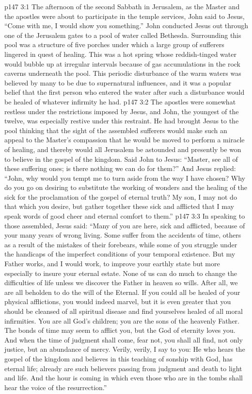 \vs p147 3:1 The afternoon of the second Sabbath in Jerusalem, as the Master and the apostles were about to participate in the temple services, John said to Jesus, “Come with me, I would show you something.” John conducted Jesus out through one of the Jerusalem gates to a pool of water called Bethesda. Surrounding this pool was a structure of five porches under which a large group of sufferers lingered in quest of healing. This was a hot spring whose reddish\hyp{}tinged water would bubble up at irregular intervals because of gas accumulations in the rock caverns underneath the pool. This periodic disturbance of the warm waters was believed by many to be due to supernatural influences, and it was a popular belief that the first person who entered the water after such a disturbance would be healed of whatever infirmity he had.
\vs p147 3:2 The apostles were somewhat restless under the restrictions imposed by Jesus, and John, the youngest of the twelve, was especially restive under this restraint. He had brought Jesus to the pool thinking that the sight of the assembled sufferers would make such an appeal to the Master’s compassion that he would be moved to perform a miracle of healing, and thereby would all Jerusalem be astounded and presently be won to believe in the gospel of the kingdom. Said John to Jesus: “Master, see all of these suffering ones; is there nothing we can do for them?” And Jesus replied: \textcolor{ubdarkred}{“John, why would you tempt me to turn aside from the way I have chosen? Why do you go on desiring to substitute the working of wonders and the healing of the sick for the proclamation of the gospel of eternal truth? My son, I may not do that which you desire, but gather together these sick and afflicted that I may speak words of good cheer and eternal comfort to them.”}
\vs p147 3:3 In speaking to those assembled, Jesus said: \textcolor{ubdarkred}{“Many of you are here, sick and afflicted, because of your many years of wrong living. Some suffer from the accidents of time, others as a result of the mistakes of their forebears, while some of you struggle under the handicaps of the imperfect conditions of your temporal existence. But my Father works, and I would work, to improve your earthly state but more especially to insure your eternal estate. None of us can do much to change the difficulties of life unless we discover the Father in heaven so wills. After all, we are all beholden to do the will of the Eternal. If you could all be healed of your physical afflictions, you would indeed marvel, but it is even greater that you should be cleansed of all spiritual disease and find yourselves healed of all moral infirmities. You are all God’s children; you are the sons of the heavenly Father. The bonds of time may seem to afflict you, but the God of eternity loves you. And when the time of judgment shall come, fear not, you shall all find, not only justice, but an abundance of mercy. Verily, verily, I say to you: He who hears the gospel of the kingdom and believes in this teaching of sonship with God, has eternal life; already are such believers passing from judgment and death to light and life. And the hour is coming in which even those who are in the tombs shall hear the voice of the resurrection.”}
